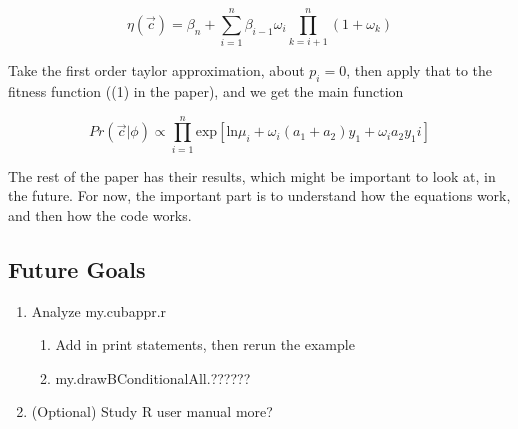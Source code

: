 $$\eta(\vec{c}) =
\beta_{n} +
\sum_{i=1}^{n}
\beta_{i-1}
\omega_i
\prod_{k=i+1}^{n}(1 + \omega_k)
$$


Take the first order taylor approximation, about $p_i=0$, then apply that to the fitness function ((1) in the paper), and we get the main function

$$Pr(\vec{c} | \phi)
\propto
\prod_{i=1}^{n}
\text{exp}[ \text{ln} \mu_i +
\omega_i(a_1 + a_2)y_1 +
\omega_i a_2 y_1 i]$$


The rest of the paper has their results, which might be important to look at, in the future. For now, the important part is to understand how the equations work, and then how the code works.


\subsection{Future Goals}
\begin{enumerate}
\item Analyze my.cubappr.r
\begin{enumerate}
\item Add in print statements, then rerun the example
\item my.drawBConditionalAll.??????
\end{enumerate}

\item (Optional) Study R user manual more?
\end{enumerate}






